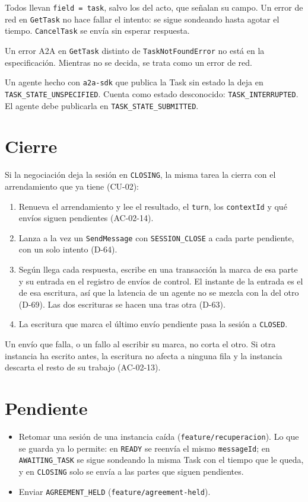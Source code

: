 Todos llevan \texttt{field = task}, salvo los del acto, que señalan su campo. Un error de red en \texttt{GetTask} no hace fallar el intento: se sigue sondeando hasta agotar el tiempo. \texttt{CancelTask} se envía sin esperar respuesta.

Un error A2A en \texttt{GetTask} distinto de \texttt{TaskNotFoundError} no está en la especificación. Mientras no se decida, se trata como un error de red.

Un agente hecho con \texttt{a2a-sdk} que publica la Task sin estado la deja en \texttt{TASK\_STATE\_UNSPECIFIED}. Cuenta como estado desconocido: \texttt{TASK\_INTERRUPTED}. El agente debe publicarla en \texttt{TASK\_STATE\_SUBMITTED}.

\section{Cierre}

Si la negociación deja la sesión en \texttt{CLOSING}, la misma tarea la cierra con el arrendamiento que ya tiene (CU-02):

\begin{enumerate}
  \item Renueva el arrendamiento y lee el resultado, el \texttt{turn}, los \texttt{contextId} y qué envíos siguen pendientes (AC-02-14).
  \item Lanza a la vez un \texttt{SendMessage} con \texttt{SESSION\_CLOSE} a cada parte pendiente, con un solo intento (D-64).
  \item Según llega cada respuesta, escribe en una transacción la marca de esa parte y su entrada en el registro de envíos de control. El instante de la entrada es el de esa escritura, así que la latencia de un agente no se mezcla con la del otro (D-69). Las dos escrituras se hacen una tras otra (D-63).
  \item La escritura que marca el último envío pendiente pasa la sesión a \texttt{CLOSED}.
\end{enumerate}

Un envío que falla, o un fallo al escribir su marca, no corta el otro. Si otra instancia ha escrito antes, la escritura no afecta a ninguna fila y la instancia descarta el resto de su trabajo (AC-02-13).

\section{Pendiente}

\begin{itemize}
  \item Retomar una sesión de una instancia caída (\texttt{feature/recuperacion}). Lo que se guarda ya lo permite: en \texttt{READY} se reenvía el mismo \texttt{messageId}; en \texttt{AWAITING\_TASK} se sigue sondeando la misma Task con el tiempo que le queda, y en \texttt{CLOSING} solo se envía a las partes que siguen pendientes.
  \item Enviar \texttt{AGREEMENT\_HELD} (\texttt{feature/agreement-held}).
\end{itemize}
